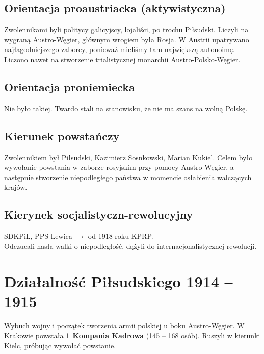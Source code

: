 \documentclass [a4paper, 11pt, oneside]{book}
\begin{document}
        \subsection{Orientacja proaustriacka (aktywistyczna)} %
        \label{sub:orientacja_proaustriacka_}
            Zwolennikami byli politycy galicyjscy, lojaliści, po trochu Piłsudski. Liczyli na wygraną Austro-Węgier, głównym wrogiem była Rosja. W Austrii upatrywano najłagodniejszego zaborcy, ponieważ mieliśmy tam największą autonoimę. Liczono nawet na stworzenie trialistycznej monarchii Austro-Polsko-Węgier.
        \subsection{Orientacja proniemiecka} %
        \label{sub:orientacja_proniemiecka}
            Nie było takiej. Twardo stali na stanowisku, że nie ma szans na wolną Polskę.
        \subsection{Kierunek powstańczy} %
        \label{sub:kierunek_powsta_czy}
            Zwolennikiem był Piłsudski, Kazimierz Sosnkowski, Marian Kukiel. Celem było wywołanie powstania w zaborze rosyjskim przy pomocy Austro-Węgier, a następnie stworzenie niepodległego państwa w momencie osłabienia walczących krajów.
        \subsection{Kierynek socjalistyczn-rewolucyjny} %
        \label{sub:kierynek_socjalistyczn_rewolucyjny}
            SDKPiL, PPS-Lewica $\rightarrow$ od 1918 roku KPRP.\\
            Odczucali hasła walki o niepodległość, dążyli do internacjonalistycznej rewolucji.
    \section{Działalność Piłsudskiego 1914 -- 1915} %
    \label{sec:dzia_alno_pi_sudzkiego_1914_1915}
        Wybuch wojny i początek tworzenia armii polskiej u boku Austro-Węgier. W Krakowie powstała \textbf{1 Kompania Kadrowa} (145 -- 168 osób). Ruszyli w kierunki Kielc, próbując wywołać powstanie.
\end{document}
